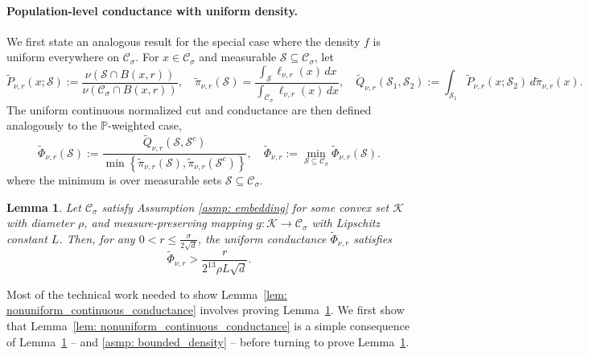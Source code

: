 \documentclass[11pt,twoside]{article}
\newtheorem{lemma}{Lemma}
\theoremstyle{definition}
\newcommand{\set}[1]{\left\{#1\right\}}
\newcommand{\1}{\mathbbm{1}}
\newcommand{\Pbb}{\mathbb{P}}
\newcommand{\Sset}{\mathcal{S}}
\newcommand{\Cset}{\mathcal{C}}
\newcommand{\Csig}{\Cset_{\sigma}}
\newcommand{\dx}{\,dx}
\begin{document}
\paragraph{Population-level conductance with uniform density.}
We first state an analogous result for the special case where the density $f$ is uniform everywhere on $\Csig$. For $x \in \Csig$ and measurable $\Sset \subseteq \Csig$, let 
\begin{equation*}
\widetilde{P}_{\nu,r}(x; \Sset) := \frac{\nu(\Sset \cap B(x,r))}{\nu(\Csig \cap B(x,r))}, \quad \widetilde{\pi}_{\nu,r}(\Sset) = \frac{\int_{\Sset} \ell_{\nu,r}(x) \dx}{\int_{\Csig} \ell_{\nu,r}(x) \dx}, \quad  \widetilde{Q}_{\nu,r}(\Sset_1,\Sset_2) := \int_{\Sset_1} \widetilde{P}_{\nu,r}(x;\Sset_2) \,d\widetilde{\pi}_{\nu,r}(x).
\end{equation*}
The uniform continuous normalized cut and conductance are then defined analogously to the $\Pbb$-weighted case,
\begin{equation*}
\widetilde{\Phi}_{\nu,r}(\Sset) := \frac{\widetilde{Q}_{\nu,r}(\Sset, \Sset^c)}{\min\set{\widetilde{\pi}_{\nu,r}(\Sset),\widetilde{\pi}_{\nu,r}(\Sset^c)}}, \quad \widetilde{\Phi}_{\nu,r} := \min_{\Sset \subseteq \Csig} \widetilde{\Phi}_{\nu,r}(\Sset).
\end{equation*}
where the minimum is over measurable sets $\Sset \subseteq \Csig$.

\begin{lemma}
	\label{lem: uniform_continuous_conductance}
	Let $\Csig$ satisfy Assumption \ref{asmp: embedding} for some convex set $\mathcal{K}$ with diameter $\rho$, and measure-preserving mapping $g: \mathcal{K} \to \Csig$ with Lipschitz constant $L$. Then, for any $0 < r \leq \frac{\sigma}{2\sqrt{d}}$, the uniform conductance $\widetilde{\Phi}_{\nu,r}$ satisfies
	\begin{equation*}
	\widetilde{\Phi}_{\nu,r} > \frac{r}{2^{13} \rho L \sqrt{d}}.
	\end{equation*}
\end{lemma}

Most of the technical work needed to show Lemma~\ref{lem: nonuniform_continuous_conductance} involves proving Lemma~\ref{lem: uniform_continuous_conductance}. We first show that  Lemma~\ref{lem: nonuniform_continuous_conductance} is a simple consequence of Lemma~\ref{lem: uniform_continuous_conductance} -- and \ref{asmp: bounded_density} -- before turning to prove Lemma~\ref{lem: uniform_continuous_conductance}.
\end{document}
